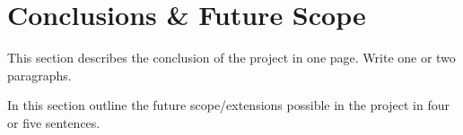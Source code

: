 \chapter{Conclusions \& Future Scope}
	

This section describes the conclusion of the project in one page. Write one or two paragraphs.

\par 
In this section outline the future scope/extensions possible in the project in four or five	sentences.